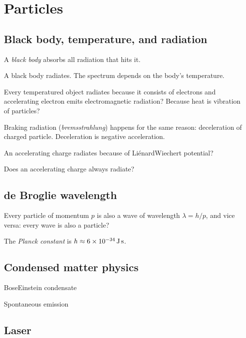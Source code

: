 \chapter{Particles}

\section{Black body, temperature, and radiation}

%
%
A \emph{black body} absorbs all radiation that hits it.

A black body radiates.
The spectrum depends on the body's temperature.

Every temperatured object radiates
because it consists of electrons and
accelerating electron emits electromagnetic radiation?
Because heat is vibration of particles?

%
%
Braking radiation (\emph{bremsstrahlung}) happens for the same reason:
deceleration of charged particle.
Deceleration is negative acceleration.

An accelerating charge radiates because of Li\'enard\textendash{}Wiechert potential?

Does an accelerating charge always radiate?

\section{de Broglie wavelength}

Every particle of momentum \(p\) is also a wave of wavelength \(\lambda = h / p\),
and vice versa: every wave is also a particle?

The \emph{Planck constant} is \( h \approx \SI{6E-34}{J.s} \).

\section{Condensed matter physics}

Bose\textendash{}Einstein condensate

Spontaneous emission

\section{Laser}

